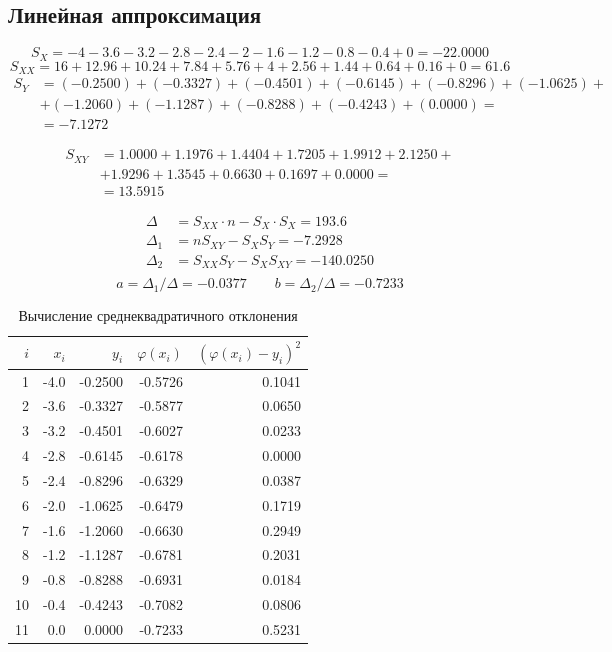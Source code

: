 \subsection{Линейная аппроксимация}
\[
  S_X = -4 -3.6  -3.2  -2.8  -2.4  -2  -1.6  -1.2  -0.8  -0.4 + 0  = -22.0000
\]
\[
  S_{XX} = 
  16 + 12.96 + 10.24 + 7.84 + 5.76 + 4 + 2.56 + 1.44 + 0.64 + 0.16 + 0 = 61.6
\]
\begin{align*}
  S_Y &=
  (-0.2500) + (-0.3327) + (-0.4501) + (-0.6145) + (-0.8296) + (-1.0625) + \\ &+ (-1.2060) + (-1.1287) + (-0.8288) + (-0.4243) + (0.0000) = \\ &= -7.1272
\end{align*}

\begin{align*}
  S_{XY} &=
  1.0000 + 1.1976 + 1.4404 + 1.7205 + 1.9912 + 2.1250 + \\ &+ 1.9296 + 1.3545 + 0.6630 + 0.1697 + 0.0000 = \\ &= 13.5915
\end{align*}

\begin{align*}
  \Delta &= S_{XX} \cdot n - S_X \cdot S_X = 193.6 \\
  \Delta_1 &= n S_{XY} - S_X S_Y = -7.2928 \\
  \Delta_2 &= S_{XX} S_Y - S_X S_{XY} = -140.0250 \\
\end{align*}
\[
  a = \Delta_1 / \Delta = -0.0377 \qquad
  b = \Delta_2 / \Delta = -0.7233
\]

\begin{table}
  \caption{Вычисление среднеквадратичного отклонения}\label{table:std_linear}
  \centering
  \begin{tabular}{rrrrr}
    \toprule
    \(i\) & \(x_i\) & \(y_i\) & \(\varphi(x_i)\) & \({(\varphi(x_i) - y_i)}^2\) \\
    \midrule
    1 & -4.0 & -0.2500 & -0.5726 & 0.1041 \\
    2 & -3.6 & -0.3327 & -0.5877 & 0.0650 \\
    3 & -3.2 & -0.4501 & -0.6027 & 0.0233 \\
    4 & -2.8 & -0.6145 & -0.6178 & 0.0000 \\
    5 & -2.4 & -0.8296 & -0.6329 & 0.0387 \\
    6 & -2.0 & -1.0625 & -0.6479 & 0.1719 \\
    7 & -1.6 & -1.2060 & -0.6630 & 0.2949 \\
    8 & -1.2 & -1.1287 & -0.6781 & 0.2031 \\
    9 & -0.8 & -0.8288 & -0.6931 & 0.0184 \\
    10 & -0.4 & -0.4243 & -0.7082 & 0.0806 \\
    11 & 0.0 & 0.0000 & -0.7233 & 0.5231 \\
    \bottomrule
  \end{tabular}
\end{table}

